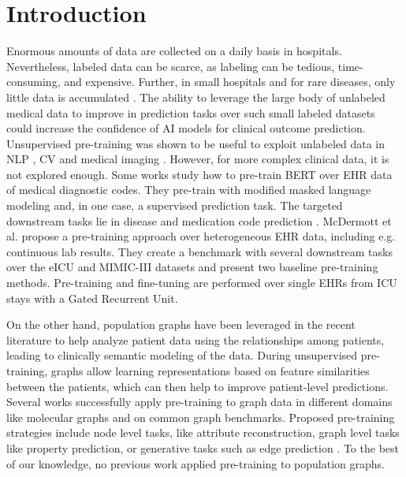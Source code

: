 \documentclass[runningheads]{llncs}
\begin{document}
\section{Introduction}

Enormous amounts of data are collected on a daily basis in hospitals. Nevertheless, labeled data can be scarce, as labeling can be tedious, time-consuming, and expensive. Further, in small hospitals and for rare diseases, only little data is accumulated \cite{mitani2020small}. The ability to leverage the large body of unlabeled medical data to improve in prediction tasks over such small labeled datasets could increase the confidence of AI models for clinical outcome prediction. 
Unsupervised pre-training was shown to be useful to exploit unlabeled data in NLP
\cite{radford2018improving,devlin2018bert}, CV \cite{pathak2016context,bao2021beit} and medical imaging \cite{ouyang2020self,chen2019self}. However, for more complex clinical data, it is not explored enough. Some works study how to pre-train BERT \cite{devlin2018bert} over EHR data of medical diagnostic codes. They pre-train with modified masked language modeling and, in one case, a supervised prediction task. The targeted downstream tasks lie in disease and medication code prediction \cite{shang2019pre,li2020behrt,rasmy2021medbert}. McDermott et al. \cite{mcdermott2021EHRbenchmark} propose a pre-training approach over heterogeneous EHR data, including e.g. continuous lab results. They create a benchmark with several downstream tasks over the eICU \cite{pollard2018eicu} and MIMIC-III \cite{mimic} datasets and present two baseline pre-training methods. Pre-training and fine-tuning are performed over single EHRs from ICU stays with a Gated Recurrent Unit.

On the other hand, population graphs have been leveraged in the recent literature to help analyze patient data using the relationships among patients, leading to clinically semantic modeling of the data. During unsupervised pre-training, graphs allow learning representations based on feature similarities between the patients, which can then help to improve patient-level predictions. Several works successfully apply pre-training to graph data in different domains like molecular graphs and on common graph benchmarks. Proposed pre-training strategies include node level tasks, like attribute reconstruction, graph level tasks like property prediction, or generative tasks such as edge prediction \cite{hu2019strategies,rong2020grover,zhang2020graphbert,hu2020gpt,lu2021learning}.
To the best of our knowledge, no previous work applied pre-training to population graphs.
\end{document}
